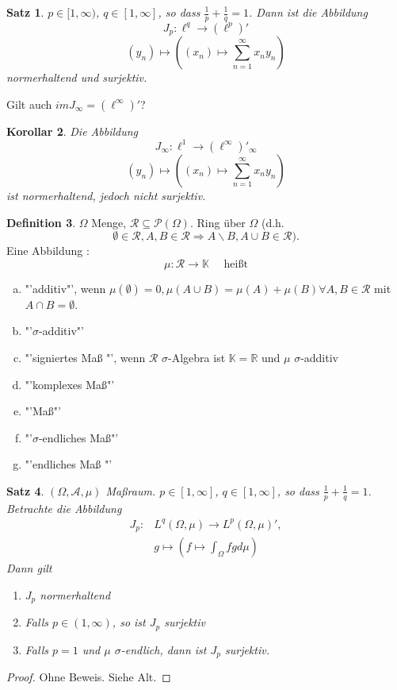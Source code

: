 \documentclass[ngerman]{report}
\theoremstyle{plain}%
\newtheorem{thm}{Satz}[chapter]
\newtheorem{cor}[thm]{Korollar}
\theoremstyle{definition}%
\newtheorem{definition}[thm]{Definition}
\theoremstyle{myStyle}
\newcommand{\R}{\mathbb{R}}
\newcommand{\K}{\mathbb{K}}
\newcommand{\df}[1][]{%
	\overset{#1}{\Rightarrow}
}
\begin{document}
	\begin{thm}
		$p\in [1,\infty)$, $q\in [1,\infty]$, so dass $\frac{1}{p} + \frac{1}{q} = 1$. 
		Dann ist die Abbildung 
			$$J_p : \ell^q \to (\ell^p)'$$
			$$ (y_n) \mapsto ((x_n) \mapsto \sum_{n=1}^\infty x_ny_n)$$
		normerhaltend und surjektiv.
	\end{thm}

	Gilt auch $imJ_\infty = (\ell^\infty)'$?

	\begin{cor}
		Die Abbildung 
		$$J_\infty : \ell^1 \to (\ell^\infty)'_\infty$$
		$$(y_n) \mapsto ((x_n) \mapsto \sum_{n=1}^\infty x_ny_n)$$
		ist normerhaltend, jedoch nicht surjektiv.
	\end{cor}

	\begin{definition}
		$\Omega$ Menge, $\mathcal{R} \subseteq \mathcal{P}(\Omega)$. 
		Ring über $\Omega$ (d.h. 
		$$\emptyset \in \mathcal{R}, A,B \in \mathcal{R} \df A\backslash B, A\cup B \in \mathcal{R}).$$
		 Eine Abbildung : 
			$$ \mu: \mathcal{R} \to \K \quad \text{ heißt}$$ 
	\begin{enumerate}[a)]
		\item "'additiv"', wenn $\mu(\emptyset) = 0, \mu(A\cup B) = \mu(A) + \mu(B) \forall A,B \in \mathcal{R}$ mit $A\cap B = \emptyset$.
		\item "'$\sigma$-additiv"'
		\item "'signiertes Maß "', wenn $\mathcal{R}$ $\sigma$-Algebra ist $\K = \R$ und $\mu$ $\sigma$-additiv
		\item "'komplexes Maß"'
		\item "'Maß"'
		\item "'$\sigma$-endliches Maß"'
		\item "'endliches Maß "'
	\end{enumerate}
	\end{definition}

	\begin{thm}
		$(\Omega, \mathcal{A}, \mu)$ Maßraum. $p\in [1, \infty]$, $q\in [1,\infty]$, so dass $\frac{1}{p} + \frac{1}{q} = 1$. Betrachte die Abbildung
		\begin{equation}
		\begin{split}
			 J_p : & L^q(\Omega,\mu) \to L^p (\Omega, \mu)',\\ &
			 g \mapsto (f \mapsto \int_\Omega fg d\mu) 		
		\end{split}
		\end{equation}
		Dann gilt 
			\begin{enumerate}
				\item $J_p$ normerhaltend
				\item Falls $p \in (1,\infty)$, so ist $J_p$ surjektiv
				\item Falls $p = 1$ und $\mu$ $\sigma$-endlich, dann ist $J_p$ surjektiv.
			\end{enumerate}
	\end{thm}
	\begin{proof}
		Ohne Beweis. Siehe Alt.
	\end{proof}
	
\end{document}
